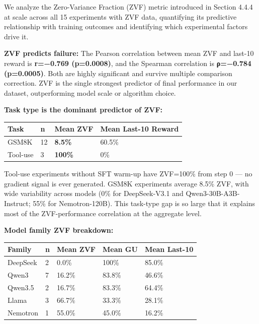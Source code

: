 \documentclass[
  american,
  11pt,
  a4paper,
  oneside]{report}
\newcounter{none} %
\begin{document}
We analyze the Zero-Variance Fraction (ZVF) metric introduced in Section
4.4.4 at scale across all 15 experiments with ZVF data, quantifying its
predictive relationship with training outcomes and identifying which
experimental factors drive it.

\textbf{ZVF predicts failure:} The Pearson correlation between mean ZVF
and last-10 reward is \textbf{r=−0.769 (p=0.0008)}, and the Spearman
correlation is \textbf{ρ=−0.784 (p=0.0005)}. Both are highly significant
and survive multiple comparison correction. ZVF is the single strongest
predictor of final performance in our dataset, outperforming model scale
or algorithm choice.

\textbf{Task type is the dominant predictor of ZVF:}

{\def\LTcaptype{none} %
\begin{longtable}[]{@{}llll@{}}
\toprule\noalign{}
Task & n & Mean ZVF & Mean Last-10 Reward \\
\midrule\noalign{}
\endhead
\bottomrule\noalign{}
\endlastfoot
GSM8K & 12 & \textbf{8.5\%} & 60.5\% \\
Tool-use & 3 & \textbf{100\%} & 0\% \\
\end{longtable}
}

Tool-use experiments without SFT warm-up have ZVF=100\% from step 0 ---
no gradient signal is ever generated. GSM8K experiments average 8.5\%
ZVF, with wide variability across models (0\% for DeepSeek-V3.1 and
Qwen3-30B-A3B-Instruct; 55\% for Nemotron-120B). This task-type gap is
so large that it explains most of the ZVF-performance correlation at the
aggregate level.

\textbf{Model family ZVF breakdown:}

{\def\LTcaptype{none} %
\begin{longtable}[]{@{}lllll@{}}
\toprule\noalign{}
Family & n & Mean ZVF & Mean GU & Mean Last-10 \\
\midrule\noalign{}
\endhead
\bottomrule\noalign{}
\endlastfoot
DeepSeek & 2 & 0.0\% & 100\% & 85.0\% \\
Qwen3 & 7 & 16.2\% & 83.8\% & 46.6\% \\
Qwen3.5 & 2 & 16.7\% & 83.3\% & 64.4\% \\
Llama & 3 & 66.7\% & 33.3\% & 28.1\% \\
Nemotron & 1 & 55.0\% & 45.0\% & 16.2\% \\
\end{longtable}
}
\end{document}
